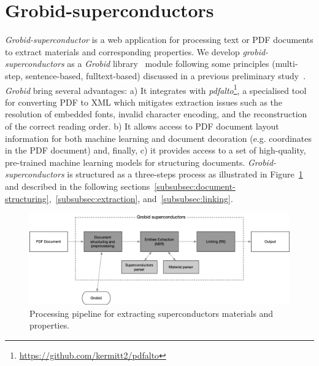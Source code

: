 \documentclass[]{interact}
\theoremstyle{plain}%
\theoremstyle{definition}
\theoremstyle{remark}
\begin{document}
\section{Grobid-superconductors}

\textit{Grobid-superconductor} is a web application for processing text or PDF documents to extract materials and corresponding properties. 
We develop \textit{grobid-superconductors} as a \textit{Grobid} library~\cite{GROBID} module following some principles (multi-step, sentence-based, fulltext-based) discussed in a previous preliminary study~\cite{foppiano:hal-02870896}.  
\textit{Grobid} bring several advantages: a) It integrates with \textit{pdfalto}\footnote{\url{https://github.com/kermitt2/pdfalto}}, a specialised tool for converting PDF to XML which mitigates extraction issues such as the resolution of embedded fonts, invalid character encoding, and the reconstruction of the correct reading order. 
b) It allows access to PDF document layout information for both machine learning and document decoration (e.g. coordinates in the PDF document) and, finally, c) it provides access to a set of high-quality, pre-trained machine learning models for structuring documents.
\textit{Grobid-superconductors} is structured as a three-steps process as illustrated in Figure~\ref{fig:pipeline-overview} and described in the following sections~\ref{subsubsec:document-structuring},~\ref{subsubsec:extraction}, and~\ref{subsubsec:linking}.

\begin{figure}[ht]
\includegraphics[width=\textwidth]{overview-schema-3}
\caption{Processing pipeline for extracting superconductors materials and properties. }
\label{fig:pipeline-overview}
\end{figure}
\end{document}
